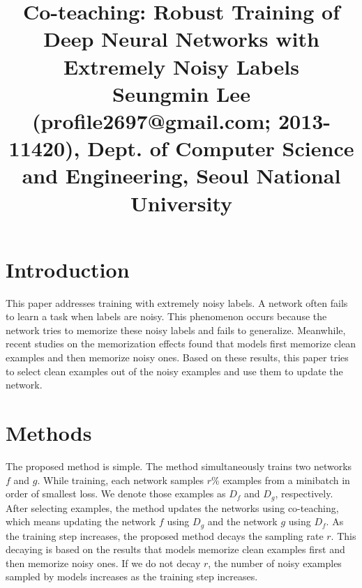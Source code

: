 \documentclass[10pt,twocolumn,letterpaper]{article}
\begin{document}
\title{Co-teaching: Robust Training of Deep Neural Networks with Extremely Noisy Labels \\ {\rm {\normalsize Seungmin Lee (profile2697@gmail.com; 2013-11420), Dept. of Computer Science and Engineering, Seoul National University}}} 

\maketitle
\thispagestyle{empty}


\section{Introduction}
This paper addresses training with extremely noisy labels. A network often fails to learn a task when labels are noisy. This phenomenon occurs because the network tries to memorize these noisy labels and fails to generalize. Meanwhile, recent studies on the memorization effects found that models first memorize clean examples and then memorize noisy ones. Based on these results, this paper tries to select clean examples out of the noisy examples and use them to update the network.

\section{Methods} 
The proposed method is simple. The method simultaneously trains two networks $f$ and $g$. While training, each network samples $r$\% examples from a minibatch in order of smallest loss. We denote those examples as $D_f$ and $D_g$, respectively. After selecting examples, the method updates the networks using co-teaching, which means updating the network $f$ using $D_g$ and the network $g$ using $D_f$. As the training step increases, the proposed method decays the sampling rate  $r$. This decaying is based on the results that models memorize clean examples first and then memorize noisy ones. If we do not decay $r$, the number of noisy examples sampled by models increases as the training step increases.




{\small


}
\end{document}
